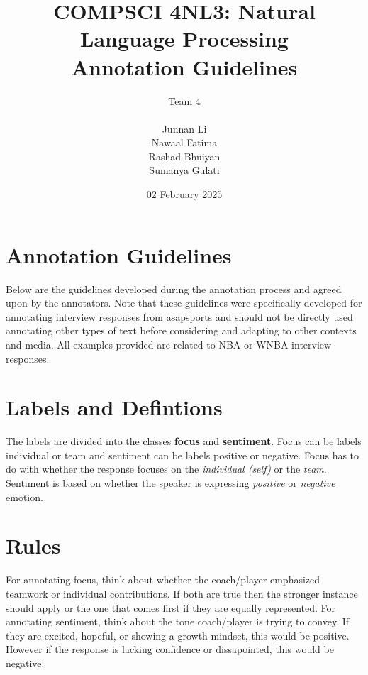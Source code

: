 \documentclass[titlepage]{article}
\title{COMPSCI 4NL3: Natural Language Processing\\
Annotation Guidelines}
\author{Team 4\\
\\ Junnan Li
\\ Nawaal Fatima
\\ Rashad Bhuiyan
\\ Sumanya Gulati}
\date{02 February 2025}
\begin{document}
\begin{titlepage}
  \maketitle
\end{titlepage}

\newpage

\section{Annotation Guidelines}
Below are the guidelines developed during the annotation process and agreed upon 
by the annotators. Note that these guidelines were specifically developed for 
annotating interview responses from asapsports and should not be directly used 
annotating other types of text before considering and adapting to other contexts and media. 
All examples provided are related to NBA or WNBA interview responses.

\section{Labels and Defintions}
The labels are divided into the classes \textbf{focus} and \textbf{sentiment}. Focus can
be labels individual or team and sentiment can be labels positive or negative. Focus has 
to do with whether the response focuses on the \emph{individual (self)} or the \emph{team}. 
Sentiment is based on whether the speaker is expressing \emph{positive} or \emph{negative} 
emotion.

\section{Rules}
For annotating focus, think about whether the coach/player emphasized teamwork or individual 
contributions. If both are true then the stronger instance should apply or the one that comes 
first if they are equally represented. For annotating sentiment, think about the tone 
coach/player is trying to convey. If they are excited, hopeful, or showing a growth-mindset, 
this would be positive. However if the response is lacking confidence or dissapointed, this 
would be negative.
\end{document}
